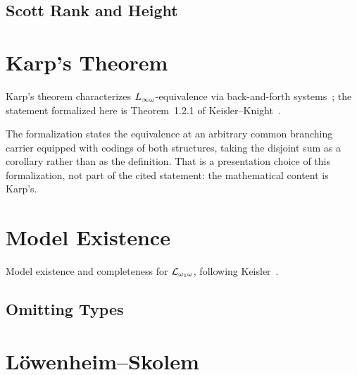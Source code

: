 
\section{Scott Rank and Height}





\chapter{Karp's Theorem}

Karp's theorem characterizes $L_{\infty\omega}$-equivalence via back-and-forth
systems~\cite{karp1965}; the statement formalized here is Theorem~1.2.1 of
Keisler--Knight~\cite{keislerknight2004}.

The formalization states the equivalence at an arbitrary common branching carrier
equipped with codings of both structures, taking the disjoint sum as a corollary rather
than as the definition.  That is a presentation choice of this formalization, not part of
the cited statement: the mathematical content is Karp's.




\chapter{Model Existence}

Model existence and completeness for $\mathcal{L}_{\omega_1\omega}$, following
Keisler~\cite{keisler1971}.



\section{Omitting Types}



\chapter{L\"owenheim--Skolem}

